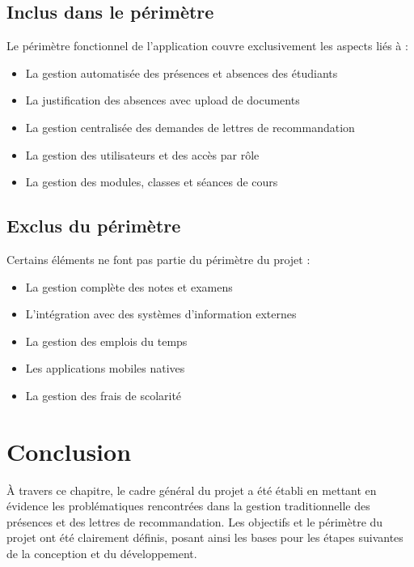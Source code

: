 \documentclass[12pt, a4paper, openright]{report}
\begin{document}
\subsection{Inclus dans le périmètre}

Le périmètre fonctionnel de l'application couvre exclusivement les aspects liés à :

\begin{itemize}
    \item La gestion automatisée des présences et absences des étudiants
    \item La justification des absences avec upload de documents
    \item La gestion centralisée des demandes de lettres de recommandation
    \item La gestion des utilisateurs et des accès par rôle
    \item La gestion des modules, classes et séances de cours
\end{itemize}

\subsection{Exclus du périmètre}

Certains éléments ne font pas partie du périmètre du projet :

\begin{itemize}
    \item La gestion complète des notes et examens
    \item L'intégration avec des systèmes d'information externes
    \item La gestion des emplois du temps
    \item Les applications mobiles natives
    \item La gestion des frais de scolarité
\end{itemize}

\section{Conclusion}

À travers ce chapitre, le cadre général du projet a été établi en mettant en évidence les problématiques rencontrées dans la gestion traditionnelle des présences et des lettres de recommandation. Les objectifs et le périmètre du projet ont été clairement définis, posant ainsi les bases pour les étapes suivantes de la conception et du développement.

\cleardoublepage
\end{document}
